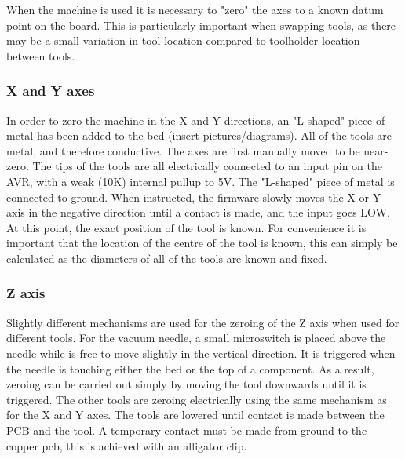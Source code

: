 When the machine is used it is necessary to "zero" the axes to a known datum point on the board. This is particularly important when swapping tools, as there may
be a small variation in tool location compared to toolholder location between tools.

\subsubsection{X and Y axes}

In order to zero the machine in the X and Y directions, an "L-shaped" piece of metal has been added to the bed (insert pictures/diagrams). All of the tools are metal,
and therefore conductive. The axes are first manually moved to be near-zero. The tips of the tools are all electrically connected to an input pin on the AVR, with a weak (10K) internal pullup to 5V.
The "L-shaped" piece of metal is connected to ground. When instructed, the firmware slowly moves the X or Y axis in the negative direction until a contact is made, and the input goes LOW. At this point,
the exact position of the tool is known. For convenience it is important that the location of the centre of the tool is known, this can simply be calculated as the diameters of all of the tools are known and fixed.

\subsubsection{Z axis}

Slightly different mechanisms are used for the zeroing of the Z axis when used for different tools. 
For the vacuum needle, a small microswitch is placed above the needle while is free to move 
slightly in the vertical direction. It is triggered when the needle is touching either the bed or the top of a component. As a result, zeroing can be carried out simply by 
moving the tool downwards until it is triggered.
The other tools are zeroing electrically using the same mechanism as for the X and Y axes. The tools are lowered until contact is made between the PCB and the tool. A temporary contact must be made from ground
to the copper pcb, this is achieved with an alligator clip.




